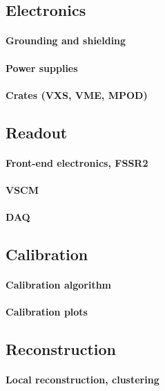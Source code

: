 \subsection{Electronics}
\paragraph{Grounding and shielding}
\paragraph{Power supplies}
\paragraph{Crates (VXS, VME, MPOD)}
\subsection{Readout}
\paragraph{Front-end electronics, FSSR2}
\paragraph{VSCM}
\paragraph{DAQ}
\subsection{Calibration}
\paragraph{Calibration algorithm}
\paragraph{Calibration plots}
\subsection{Reconstruction}
\paragraph{Local reconstruction, clustering}
